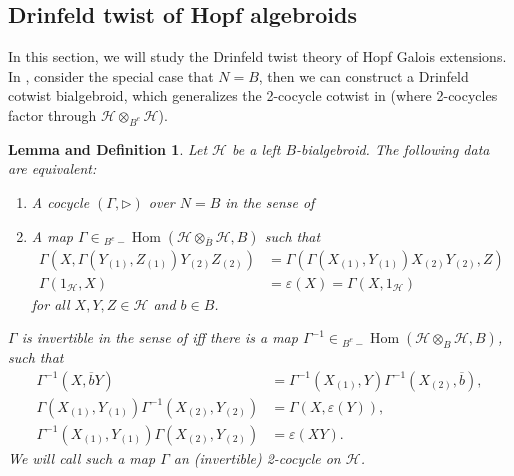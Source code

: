 \documentclass[a4paper,reqno]{amsart}
\DeclareMathOperator{\Hom}{Hom}
\numberwithin{equation}{section}
\theoremstyle{plain}
\newtheorem{LD}[thm]{Lemma and Definition}
\theoremstyle{remark}
\numberwithin{equation}{section}
\newcommand{\ot}{\otimes}
\newcommand{\BB}{\overline{B}}
\newcommand{\one}[1]{{#1}{}_{\scriptscriptstyle{(1)}}}
\newcommand{\two}[1]{{#1}{}_{\scriptscriptstyle{(2)}}}
\renewcommand{\o}{{}_{\scriptscriptstyle{(1)}}}
\renewcommand{\t}{{}_{\scriptscriptstyle{(2)}}}
\newcommand{\la}{{\triangleright}}
\newcommand{\CH}{\mathcal{H}}
\begin{document}
\subsection{Drinfeld twist of Hopf algebroids}\label{sec. Drinfeld twist of Hopf algebroids}

In this section, we will study the Drinfeld twist theory of Hopf Galois extensions. In , consider the special case that $N=B$, then we can construct a Drinfeld cotwist bialgebroid, which generalizes the 2-cocycle cotwist in \cite{Boehm, HM22, HM23} (where 2-cocycles factor through $\CH\ot_{B^e}\CH$). 



\begin{LD}\label{def. 2-cocycle on L}
    Let $\CH$ be a left $B$-bialgebroid. The following data are equivalent:
    \begin{enumerate}
        \item A cocycle $(\Gamma,\la)$ over $N=B$ in the sense of 
        \item A map $\Gamma\in {}_{B^{e}-}\Hom(\CH\otimes_{\BB}\CH, B)$ such that 
        \begin{align}\Gamma(X, \Gamma(\one{Y}, \one{Z})\two{Y}\two{Z})&=\Gamma(\Gamma(\one{X}, \one{Y})\two{X}\two{Y}, Z)\label{i}\\%
        \Gamma(1_{\CH}, X)&=\varepsilon(X)=\Gamma(X, 1_{\CH})\label{ii}%
    \end{align} 
for all $X, Y, Z\in \CH$ and $b\in B$.
    \end{enumerate}
 $\Gamma$ is invertible in the sense of  iff  there is a map $\Gamma^{-1}\in {}_{B^{e}-}\Hom(\CH\otimes_{B}\CH, B)$, such that
 \begin{align}
         \Gamma^{-1}(X, \overline{b}Y)&=\Gamma^{-1}(X\o, Y)\Gamma^{-1}(X\t, \overline{b}),\label{iii}\\%
        \Gamma(X\o,Y\o)\Gamma^{-1}(X\t, Y\t)&=\Gamma(X, \varepsilon(Y)), \label{iv}\\ %
        \Gamma^{-1}(X\o,Y\o)\Gamma(X\t, Y\t)&=\varepsilon(XY).\label{v} 
    \end{align} 
    We will call such a map $\Gamma$ an (invertible) 2-cocycle on $\CH$.
\end{LD}
\end{document}
